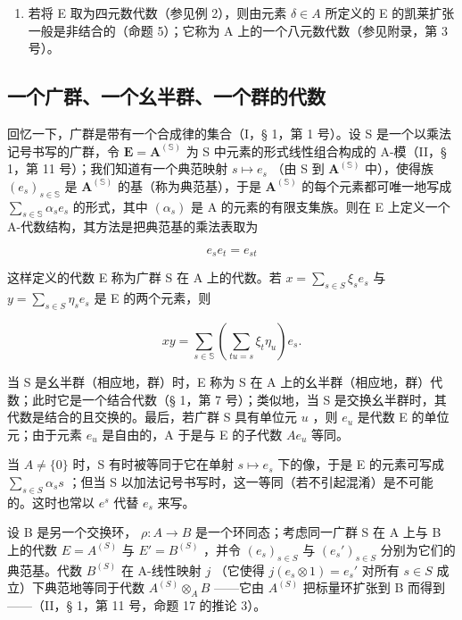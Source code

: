 \begin{enumerate}
\def\labelenumi{(\arabic{enumi})}
\setcounter{enumi}{2}
\tightlist
\item
  若将 E 取为四元数代数（参见例 2），则由元素 \(\delta \in A\) 所定义的 E 的凯莱扩张一般是非结合的（命题 5）；它称为 A 上的一个八元数代数（参见附录，第 3 号）。
\end{enumerate}

\subsection{一个广群、一个幺半群、一个群的代数}

回忆一下，广群是带有一个合成律的集合（I，§ 1，第 1 号）。设 S 是一个以乘法记号书写的广群，令 \(\mathbf{E} = \mathbf{A}^{(\mathbb{S})}\) 为 S 中元素的形式线性组合构成的 A-模（II，§ 1，第 11 号）；我们知道有一个典范映射 \(s \mapsto e_s\) （由 S 到 \(\mathbf{A}^{(\mathbb{S})}\) 中），使得族 \((e_s)_{s \in \mathbb{S}}\) 是 \(\mathbf{A}^{(\mathbb{S})}\) 的基（称为典范基），于是 \(\mathbf{A}^{(\mathbb{S})}\) 的每个元素都可唯一地写成 \(\sum_{s \in \mathbb{S}} \alpha_s e_s\) 的形式，其中 \((\alpha_s)\) 是 A 的元素的有限支集族。则在 E 上定义一个 A-代数结构，其方法是把典范基的乘法表取为

\[
e _ {s} e _ {t} = e _ {s t}\tag{35}
\]

这样定义的代数 E 称为广群 S 在 A 上的代数。若 \(x = \sum_{s \in S} \xi_{s} e_{s}\) 与 \(y = \sum_{s \in S} \eta_{s} e_{s}\) 是 E 的两个元素，则

\[
x y = \sum_ {s \in \mathbb {S}} \left(\sum_ {t u = s} \xi_ {t} \eta_ {u}\right) e _ {s}.
\]

当 S 是幺半群（相应地，群）时，E 称为 S 在 A 上的幺半群（相应地，群）代数；此时它是一个结合代数（§ 1，第 7 号）；类似地，当 S 是交换幺半群时，其代数是结合的且交换的。最后，若广群 S 具有单位元 \(u\) ，则 \(e_u\) 是代数 E 的单位元；由于元素 \(e_u\) 是自由的，A 于是与 E 的子代数 \(Ae_u\) 等同。

当 \(A \neq \{0\}\) 时，S 有时被等同于它在单射 \(s \mapsto e_{s}\) 下的像，于是 E 的元素可写成 \(\sum_{s \in S} \alpha_{s}s\) ；但当 S 以加法记号书写时，这一等同（若不引起混淆）是不可能的。这时也常以 \(e^{s}\) 代替 \(e_{s}\) 来写。

设 B 是另一个交换环， \(\rho: A \to B\) 是一个环同态；考虑同一广群 S 在 A 上与 B 上的代数 \(E = A^{(S)}\) 与 \(E' = B^{(S)}\) ，并令 \((e_s)_{s \in S}\) 与 \((e_s')_{s \in S}\) 分别为它们的典范基。代数 \(B^{(S)}\) 在 A-线性映射 \(j\) （它使得 \(j(e_s \otimes 1) = e_s'\) 对所有 \(s \in S\) 成立）下典范地等同于代数 \(A^{(S)} \otimes_A B\) ——它由 \(A^{(S)}\) 把标量环扩张到 B 而得到——（II，§ 1，第 11 号，命题 17 的推论 3）。


